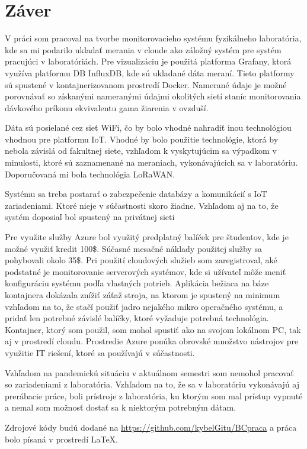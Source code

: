 \documentclass[../main.tex]{subfiles}
\begin{document}
\pagebreak
\section{Záver}
V práci som pracoval na tvorbe monitorovacieho systému fyzikálneho laboratória, kde sa mi podarilo ukladať merania v cloude ako záložný systém pre systém pracujúci v laboratóriách. Pre vizualizáciu je použitá platforma Grafany, ktorá využíva platformu DB InfluxDB, kde sú ukladané dáta meraní. Tieto platformy sú spustené v kontajnerizovanom prostredí Docker. Namerané údaje je možné porovnávať so získanými nameranými údajmi okolitých sietí staníc monitorovania dávkového príkonu ekvivalentu gama žiarenia v ovzduší.
\par Dáta sú posielané cez sieť WiFi, čo by bolo vhodné nahradiť inou technológiou vhodnou pre platformu IoT. Vhodné by bolo použitie technológie, ktorá by nebola závislá od fakultnej siete, vzhľadom k vyskytujúcim sa výpadkom v minulosti, ktoré sú zaznamenané na meraniach, vykonávajúcich sa v laboratóriu. Doporučovaná mi bola technológia LoRaWAN.
\par Systému sa treba postarať o zabezpečenie databázy a komunikácií s IoT zariadeniami. Ktoré nieje v súčastnosti skoro žiadne. Vzhľadom aj na to, že systém doposiaľ bol spustený na privátnej sieti
\par Pre využite služby Azure bol využitý predplatný balíček pre študentov, kde je možné využiť kredit 100\$. Súčasné mesačné náklady použitej služby sa pohybovali okolo 35\$. Pri použití cloudových služieb som zaregistroval, aké podstatné je monitorovanie serverových systémov, kde si užívateľ môže meniť konfiguráciu systému podľa vlastných potrieb. Aplikácia bežiaca na báze kontajnera dokázala znížiť záťaž stroja, na ktorom je spustený na minimum vzhľadom na to, že stačí použiť jadro nejakého mikro operačného systému, a pridať len potrebné závislé balíčky, ktoré vyžaduje potrebná technológia. Kontajner, ktorý som použil, som mohol spustiť ako na svojom lokálnom PC, tak aj v prostredí cloudu. Prostredie Azure ponúka obrovské množstvo nástrojov pre využitie IT riešení, ktoré sa používajú v súčastnosti.
\par Vzhľadom na pandemickú situáciu v aktuálnom semestri som nemohol pracovať so zariadeniami z laboratória. Vzhľadom na to, že sa v laboratóriu vykonávajú aj prerábacie práce, boli prístroje z laboratória, ku ktorým som mal prístup vypnuté a nemal som možnosť dostať sa k niektorým potrebným dátam.

Zdrojové kódy budú dodané na \url{https://github.com/kybelGitu/BCpraca} a práca bolo písaná v prostredí \LaTeX.
\end{document}
